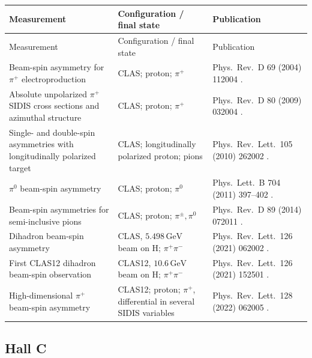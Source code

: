 \documentclass[11pt]{article}
\newcommand{\GeV}{\mathrm{GeV}}
\begin{document}
\small
\begin{longtable}{@{}p{}p{}p{}@{}}
\toprule
Measurement & Configuration / final state & Publication \\ \midrule
\endfirsthead
\toprule
Measurement & Configuration / final state & Publication \\ \midrule
\endhead
Beam-spin asymmetry for $\pi^+$ electroproduction &
CLAS; proton; $\pi^+$ &
Phys.\ Rev.\ D 69 (2004) 112004 \cite{CLAS:BSA2004}. \\

Absolute unpolarized $\pi^+$ SIDIS cross sections and azimuthal structure &
CLAS; proton; $\pi^+$ &
Phys.\ Rev.\ D 80 (2009) 032004 \cite{CLAS:unpol2009}. \\

Single- and double-spin asymmetries with longitudinally polarized target &
CLAS; longitudinally polarized proton; pions &
Phys.\ Rev.\ Lett.\ 105 (2010) 262002 \cite{CLAS:long2010}. \\

$\pi^0$ beam-spin asymmetry &
CLAS; proton; $\pi^0$ &
Phys.\ Lett.\ B 704 (2011) 397--402 \cite{CLAS:pi0BSA2011}. \\

Beam-spin asymmetries for semi-inclusive pions &
CLAS; proton; $\pi^\pm,\pi^0$ &
Phys.\ Rev.\ D 89 (2014) 072011 \cite{CLAS:BSA2014}. \\

Dihadron beam-spin asymmetry &
CLAS, $5.498\,\GeV$ beam on H; $\pi^+\pi^-$ &
Phys.\ Rev.\ Lett.\ 126 (2021) 062002 \cite{CLAS:dihadron2021}. \\

First CLAS12 dihadron beam-spin observation &
CLAS12, $10.6\,\GeV$ beam on H; $\pi^+\pi^-$ &
Phys.\ Rev.\ Lett.\ 126 (2021) 152501 \cite{CLAS12:dihadron2021}. \\

High-dimensional $\pi^+$ beam-spin asymmetry &
CLAS12; proton; $\pi^+$, differential in several SIDIS variables &
Phys.\ Rev.\ Lett.\ 128 (2022) 062005 \cite{CLAS12:piBSA2022}. \\
\bottomrule
\end{longtable}
\normalsize

\subsection{Hall C}
\end{document}
